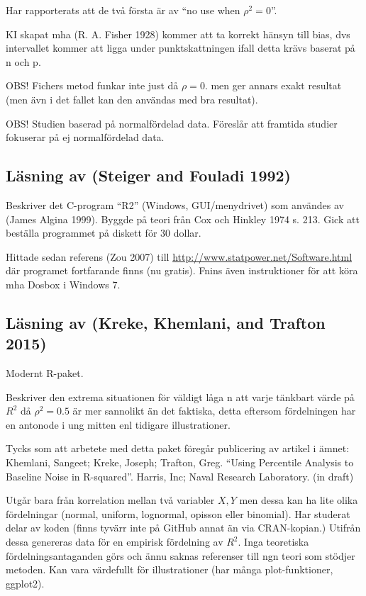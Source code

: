 \documentclass[]{article}
\begin{document}
Har rapporterats att de två första är av ``no use when \(\rho^2 = 0\)''.

KI skapat mha (R. A. Fisher 1928) kommer att ta korrekt hänsyn till
bias, dvs intervallet kommer att ligga under punktskattningen ifall
detta krävs baserat på n och p.

OBS! Fichers metod funkar inte just då \(\rho = 0\). men ger annars
exakt resultat (men ävn i det fallet kan den användas med bra resultat).

OBS! Studien baserad på normalfördelad data. Föreslår att framtida
studier fokuserar på ej normalfördelad data.

\subsection{Läsning av (Steiger and Fouladi
1992)}\label{lasning-av-steiger1992}

Beskriver det C-program ``R2'' (Windows, GUI/menydrivet) som användes av
(James Algina 1999). Byggde på teori från Cox och Hinkley 1974 s. 213.
Gick att beställa programmet på diskett för 30 dollar.

Hittade sedan referens (Zou 2007) till
\url{http://www.statpower.net/Software.html} där programet fortfarande
finns (nu gratis). Fnins även instruktioner för att köra mha Dosbox i
Windows 7.

\subsection{Läsning av (Kreke, Khemlani, and Trafton
2015)}\label{lasning-av-kreke2015}

Modernt R-paket.

Beskriver den extrema situationen för väldigt låga n att varje tänkbart
värde på \(R^2\) då \(\rho^2 = 0.5\) är mer sannolikt än det faktiska,
detta eftersom fördelningen har en antonode i ung mitten enl tidigare
illustrationer.

Tycks som att arbetete med detta paket föregår publicering av artikel i
ämnet: Khemlani, Sangeet; Kreke, Joseph; Trafton, Greg. ``Using
Percentile Analysis to Baseline Noise in R-squared''. Harris, Inc; Naval
Research Laboratory. (in draft)

Utgår bara från korrelation mellan två variabler \(X, Y\) men dessa kan
ha lite olika fördelningar (normal, uniform, lognormal, opisson eller
binomial). Har studerat delar av koden (finns tyvärr inte på GitHub
annat än via CRAN-kopian.) Utifrån dessa genereras data för en empirisk
fördelning av \(R^2\). Inga teoretiska fördelningsantaganden görs och
ännu saknas referenser till ngn teori som stödjer metoden. Kan vara
värdefullt för illustrationer (har många plot-funktioner, ggplot2).
\end{document}
